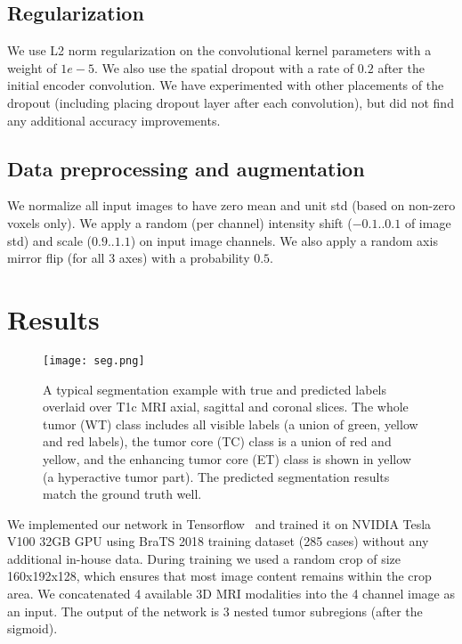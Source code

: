 \documentclass[runningheads]{llncs}
\newcommand{\0}{\ensuremath{\mathbf{0}}}
\newcommand{\1}{\ensuremath{\mathbf{1}}}
\begin{document}
 \subsection{Regularization}
 We use L2 norm regularization on the convolutional kernel parameters with a weight of $1e-5$.  We also use the spatial dropout with a rate of $0.2$  after the initial encoder convolution. We have experimented with other placements of the dropout (including placing dropout layer after each convolution), but did not find any additional accuracy improvements. 
 
  \subsection{Data preprocessing and augmentation}
  We normalize all input images to have zero mean and unit std (based on non-zero voxels only). We  apply a random (per channel) intensity  shift ($-0.1..0.1$  of image std) and scale ($0.9..1.1$) on input image channels.  We also apply a random axis mirror flip (for all 3 axes) with a probability $0.5$. 

 \section{Results}
 \label{sec:results}
 
   \begin{figure}[t] 
 	\centering
 	\texttt{[image: seg.png]}
 	\caption{A typical segmentation example with true and predicted labels overlaid over T1c MRI axial, sagittal and coronal slices.  The whole tumor (WT) class includes all visible labels (a union of green, yellow and red labels), the tumor core (TC) class is a union of red and yellow, and the enhancing tumor core (ET) class is shown in yellow (a hyperactive tumor part). The predicted segmentation results match the ground truth well.}
 	\label{fig:seg}
 	\vspace{-5mm}
 \end{figure}
 
 We implemented our network in Tensorflow~\cite{tensorflow2015} and trained it on NVIDIA Tesla V100 32GB GPU using BraTS 2018 training dataset (285 cases) without any additional in-house data. During training we used a random crop of size 160x192x128, which ensures that most image content remains within the crop area. We concatenated  4 available 3D MRI modalities into the 4 channel image as an input. The output of the network is 3 nested tumor subregions (after the sigmoid).
 
\end{document}
